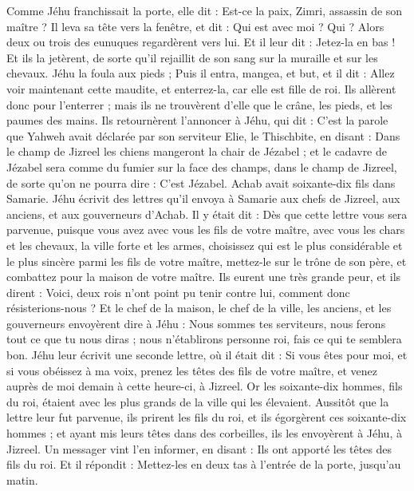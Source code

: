 \begin{multicols}{2}
Comme Jéhu franchissait la porte, elle dit : Est-ce la paix, Zimri, assassin de son maître ?
Il leva sa tête vers la fenêtre, et dit : Qui est avec moi ? Qui ? Alors deux ou trois des eunuques regardèrent vers lui.
Et il leur dit : Jetez-la en bas ! Et ils la jetèrent, de sorte qu’il rejaillit de son sang sur la muraille et sur les chevaux. Jéhu la foula aux pieds ;
Puis il entra, mangea, et but, et il dit : Allez voir maintenant cette maudite, et enterrez-la, car elle est fille de roi.
Ils allèrent donc pour l’enterrer ; mais ils ne trouvèrent d’elle que le crâne, les pieds, et les paumes des mains.
Ils retournèrent l’annoncer à Jéhu, qui dit : C’est la parole que Yahweh avait déclarée par son serviteur Elie, le Thischbite, en disant : Dans le champ de Jizreel les chiens mangeront la chair de Jézabel ;
et le cadavre de Jézabel sera comme du fumier sur la face des champs, dans le champ de Jizreel, de sorte qu’on ne pourra dire : C’est Jézabel.
\VerseOne{}Achab avait soixante-dix fils dans Samarie. Jéhu écrivit des lettres qu’il envoya à Samarie aux chefs de Jizreel, aux anciens, et aux gouverneurs d’Achab. Il y était dit :
Dès que cette lettre vous sera parvenue, puisque vous avez avec vous les fils de votre maître, avec vous les chars et les chevaux, la ville forte et les armes,
choisissez qui est le plus considérable et le plus sincère parmi les fils de votre maître, mettez-le sur le trône de son père, et combattez pour la maison de votre maître.
Ils eurent une très grande peur, et ils dirent : Voici, deux rois n’ont point pu tenir contre lui, comment donc résisterions-nous ?
Et le chef de la maison, le chef de la ville, les anciens, et les gouverneurs envoyèrent dire à Jéhu : Nous sommes tes serviteurs, nous ferons tout ce que tu nous diras ; nous n’établirons personne roi, fais ce qui te semblera bon.
Jéhu leur écrivit une seconde lettre, où il était dit : Si vous êtes pour moi, et si vous obéissez à ma voix, prenez les têtes des fils de votre maître, et venez auprès de moi demain à cette heure-ci, à Jizreel. Or les soixante-dix hommes, fils du roi, étaient avec les plus grands de la ville qui les élevaient.
Aussitôt que la lettre leur fut parvenue, ils prirent les fils du roi, et ils égorgèrent ces soixante-dix hommes ; et ayant mis leurs têtes dans des corbeilles, ils les envoyèrent à Jéhu, à Jizreel.
Un messager vint l’en informer, en disant : Ils ont apporté les têtes des fils du roi. Et il répondit : Mettez-les en deux tas à l’entrée de la porte, jusqu’au matin.

\end{multicols}
